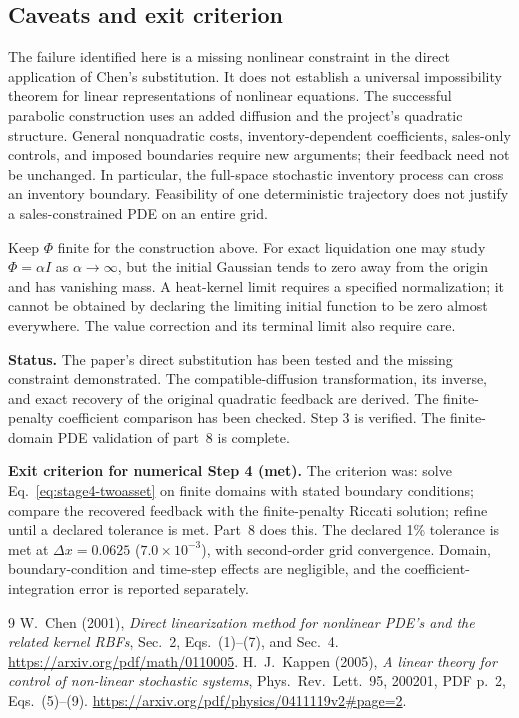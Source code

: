 \documentclass[11pt,a4paper]{article}
\begin{document}
\subsection*{Caveats and exit criterion}

The failure identified here is a missing nonlinear constraint in the
direct application of Chen's substitution. It does not establish a
universal impossibility theorem for linear representations of nonlinear
equations. The successful parabolic construction uses an added diffusion
and the project's quadratic structure. General nonquadratic costs,
inventory-dependent coefficients, sales-only controls, and imposed
boundaries require new arguments; their feedback need not be unchanged.
In particular, the full-space stochastic inventory process can cross an
inventory boundary. Feasibility of one deterministic trajectory does not
justify a sales-constrained PDE on an entire grid.

Keep $\Phi$ finite for the construction above. For exact liquidation one
may study $\Phi=\alpha I$ as $\alpha\to\infty$, but the initial Gaussian
tends to zero away from the origin and has vanishing mass. A heat-kernel
limit requires a specified normalization; it cannot be obtained by
declaring the limiting initial function to be zero almost everywhere.
The value correction and its terminal limit also require care.

\textbf{Status.} The paper's direct substitution has been tested and the
missing constraint demonstrated. The compatible-diffusion transformation,
its inverse, and exact recovery of the original quadratic feedback are
derived. The finite-penalty coefficient comparison has been checked.
Step 3 is verified. The finite-domain PDE validation of part~8 is
complete.

\textbf{Exit criterion for numerical Step 4 (met).} The criterion was:
solve Eq.~\eqref{eq:stage4-twoasset} on finite domains with stated boundary
conditions; compare the recovered feedback with the finite-penalty Riccati
solution; refine until a declared tolerance is met. Part~8 does this.
The declared 1\% tolerance is met at $\Delta x=0.0625$
($7.0\times10^{-3}$), with second-order grid convergence. Domain,
boundary-condition and time-step effects are negligible, and the
coefficient-integration error is reported separately.

\begin{thebibliography}{9}
 W.~Chen (2001),
\emph{Direct linearization method for nonlinear PDE's and the related
kernel RBFs}, Sec.~2, Eqs.~(1)--(7), and Sec.~4.
\url{https://arxiv.org/pdf/math/0110005}.
 H.~J.~Kappen (2005),
\emph{A linear theory for control of non-linear stochastic systems},
Phys.~Rev.~Lett.~95, 200201, PDF p.~2, Eqs.~(5)--(9).
\url{https://arxiv.org/pdf/physics/0411119v2#page=2}.
\end{thebibliography}
\end{document}
